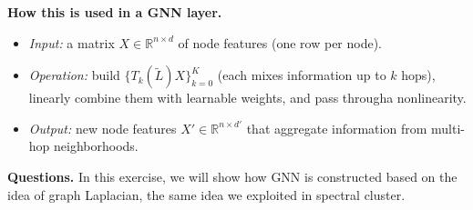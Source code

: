 \documentclass[twoside,10pt]{article}
\begin{document}
\medskip
\textbf{How this is used in a GNN layer.}
\begin{itemize}
    \item \emph{Input:} a matrix $X\in\mathbb{R}^{n\times d}$ of node features (one row per node).  
    \item \emph{Operation:} build $\{T_k(\tilde L)X\}_{k=0}^K$ (each mixes information up to $k$ hops), linearly combine them with learnable weights, and pass througha nonlinearity.  
    \item \emph{Output:} new node features $X'\in\mathbb{R}^{n\times d'}$ that aggregate information from multi-hop neighborhoods.  
\end{itemize}

\medskip
\textbf{Questions.} In this exercise, we will show how GNN is constructed based on the idea of graph Laplacian, the same idea we exploited in spectral cluster. 
\end{document}
